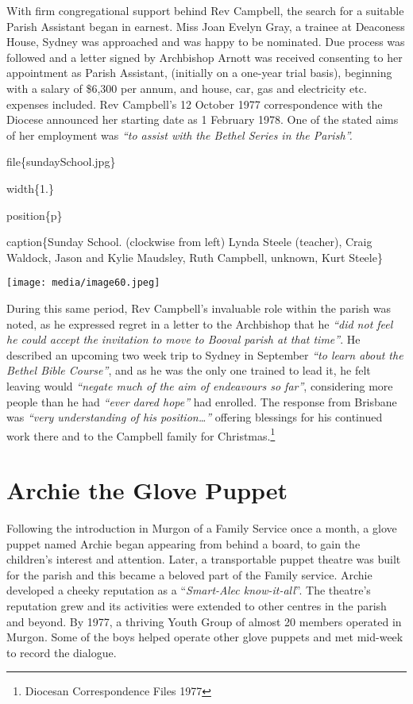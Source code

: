 With firm congregational support behind Rev Campbell, the search for a suitable Parish Assistant began in earnest. Miss Joan Evelyn Gray, a trainee at Deaconess House, Sydney was approached and was happy to be nominated. Due process was followed and a letter signed by Archbishop Arnott was received consenting to her appointment as Parish Assistant, (initially on a one-year trial basis), beginning with a salary of \$6,300 per annum, and house, car, gas and electricity etc. expenses included. Rev Campbell's 12 October 1977 correspondence with the Diocese announced her starting date as 1 February 1978. One of the stated aims of her employment was \emph{``to assist with the Bethel Series in the Parish''.}

file\{sundaySchool.jpg\}

width\{1.\}

position\{p\}

caption\{Sunday School. (clockwise from left) Lynda Steele (teacher), Craig Waldock, Jason and Kylie Maudsley, Ruth Campbell, unknown, Kurt Steele\}

\texttt{[image: media/image60.jpeg]}

During this same period, Rev Campbell's invaluable role within the parish was noted, as he expressed regret in a letter to the Archbishop that he \emph{``did not feel he could accept the invitation to move to Booval parish at that time''}. He described an upcoming two week trip to Sydney in September \emph{``to learn about the Bethel Bible Course''}, and as he was the only one trained to lead it, he felt leaving would \emph{``negate much of the aim of endeavours so far''}, considering more people than he had \emph{``ever dared hope''} had enrolled. The response from Brisbane was \emph{``very understanding of his position\ldots''} offering blessings for his continued work there and to the Campbell family for Christmas.\footnote{Diocesan Correspondence Files 1977}

\hypertarget{archie-the-glove-puppet}{%
\section{Archie the Glove Puppet}\label{archie-the-glove-puppet}}

Following the introduction in Murgon of a Family Service once a month, a glove puppet named Archie began appearing from behind a board, to gain the children's interest and attention. Later, a transportable puppet theatre was built for the parish and this became a beloved part of the Family service. Archie developed a cheeky reputation as a ``\emph{Smart-Alec know-it-all}''. The theatre's reputation grew and its activities were extended to other centres in the parish and beyond. By 1977, a thriving Youth Group of almost 20 members operated in Murgon. Some of the boys helped operate other glove puppets and met mid-week to record the dialogue.

